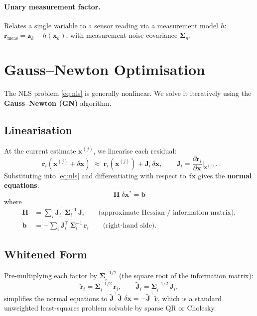 \documentclass[11pt,a4paper]{article}
\newcommand{\state}{\bm{x}}
\newcommand{\meas}{\bm{z}}
\newcommand{\resid}{\bm{r}}
\newcommand{\jac}{\bm{J}}
\newcommand{\hess}{\bm{H}}
\newcommand{\cov}{\bm{\Sigma}}
\begin{document}
\paragraph{Unary measurement factor.}  Relates a single variable to a
sensor reading via a measurement model $h$:
$\resid_{\text{meas}} = \meas_k - h(\state_k)$, with measurement noise
covariance $\cov_n$.

\section{Gauss--Newton Optimisation}
\label{sec:gauss_newton}

The NLS problem \eqref{eq:nls} is generally nonlinear.  We solve it
iteratively using the \textbf{Gauss--Newton (GN)} algorithm.

\subsection{Linearisation}

At the current estimate $\state^{(j)}$, we linearise each residual:
\begin{equation}
  \resid_i(\state^{(j)} + \delta\state)
  \;\approx\;
  \resid_i(\state^{(j)}) + \jac_i\,\delta\state,
  \qquad
  \jac_i = \frac{\partial \resid_i}{\partial \state}
           \bigg|_{\state^{(j)}}.
  \label{eq:linearise}
\end{equation}
Substituting into \eqref{eq:nls} and differentiating with respect to
$\delta\state$ gives the \textbf{normal equations}:
\begin{equation}
  \boxed{
  \hess\;\delta\state^{*} = \bm{b}
  }
  \label{eq:normal}
\end{equation}
where
\begin{align}
  \hess &= \sum_{i} \jac_i^{\!\top}\,\cov_i^{-1}\,\jac_i
          \qquad\text{(approximate Hessian / information matrix)},
  \label{eq:H} \\
  \bm{b} &= -\sum_{i} \jac_i^{\!\top}\,\cov_i^{-1}\,\resid_i
          \qquad\text{(right-hand side)}.
  \label{eq:b}
\end{align}

\subsection{Whitened Form}

Pre-multiplying each factor by $\cov_i^{-1/2}$ (the square root of the
information matrix):
\begin{equation}
  \tilde{\resid}_i = \cov_i^{-1/2}\,\resid_i,
  \qquad
  \tilde{\jac}_i = \cov_i^{-1/2}\,\jac_i,
\end{equation}
simplifies the normal equations to $\tilde{\jac}^{\!\top}\tilde{\jac}\;\delta\state
= -\tilde{\jac}^{\!\top}\tilde{\resid}$, which is a standard
unweighted least-squares problem solvable by sparse QR or Cholesky.
\end{document}

